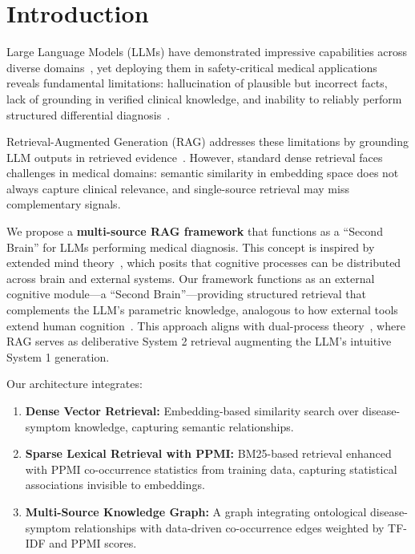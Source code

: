 \documentclass[preprint,12pt]{elsarticle}
\begin{document}
\section{Introduction}
\label{sec:introduction}

Large Language Models (LLMs) have demonstrated impressive capabilities across diverse domains~\cite{brown2020language,openai2023gpt4}, yet deploying them in safety-critical medical applications reveals fundamental limitations: hallucination of plausible but incorrect facts, lack of grounding in verified clinical knowledge, and inability to reliably perform structured differential diagnosis~\cite{ji2023survey,singhal2023large}.

Retrieval-Augmented Generation (RAG) addresses these limitations by grounding LLM outputs in retrieved evidence~\cite{lewis2020retrieval,gao2023retrieval}. However, standard dense retrieval faces challenges in medical domains: semantic similarity in embedding space does not always capture clinical relevance, and single-source retrieval may miss complementary signals. 

We propose a \textbf{multi-source RAG framework} that functions as a ``Second Brain'' for LLMs performing medical diagnosis. This concept is inspired by extended mind theory~\cite{clark1998extended}, which posits that cognitive processes can be distributed across brain and external systems. Our framework functions as an external cognitive module—a ``Second Brain''—providing structured retrieval that complements the LLM's parametric knowledge, analogous to how external tools extend human cognition~\cite{hutchins1995cognition}. This approach aligns with dual-process theory~\cite{kahneman2011thinking}, where RAG serves as deliberative System 2 retrieval augmenting the LLM's intuitive System 1 generation.

Our architecture integrates:

\begin{enumerate}
    \item \textbf{Dense Vector Retrieval:} Embedding-based similarity search over disease-symptom knowledge, capturing semantic relationships.
    \item \textbf{Sparse Lexical Retrieval with PPMI:} BM25-based retrieval enhanced with PPMI co-occurrence statistics from training data, capturing statistical associations invisible to embeddings.
    \item \textbf{Multi-Source Knowledge Graph:} A graph integrating ontological disease-symptom relationships with data-driven co-occurrence edges weighted by TF-IDF and PPMI scores.
\end{enumerate}
\end{document}
